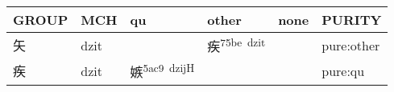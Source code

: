 \documentclass[14pt,a4paper]{scrartcl}
\begin{document}
\begin{longtable}[c]{@{}llllll@{}}
\toprule
\begin{minipage}[b]{0.14\columnwidth}\raggedright\strut
GROUP
\strut\end{minipage} &
\begin{minipage}[b]{0.14\columnwidth}\raggedright\strut
MCH
\strut\end{minipage} &
\begin{minipage}[b]{0.14\columnwidth}\raggedright\strut
qu
\strut\end{minipage} &
\begin{minipage}[b]{0.14\columnwidth}\raggedright\strut
other
\strut\end{minipage} &
\begin{minipage}[b]{0.14\columnwidth}\raggedright\strut
none
\strut\end{minipage} &
\begin{minipage}[b]{0.14\columnwidth}\raggedright\strut
PURITY
\strut\end{minipage}\tabularnewline
\midrule
\endhead
\begin{minipage}[t]{0.14\columnwidth}\raggedright\strut
矢
\strut\end{minipage} &
\begin{minipage}[t]{0.14\columnwidth}\raggedright\strut
dzit
\strut\end{minipage} &
\begin{minipage}[t]{0.14\columnwidth}\raggedright\strut
\strut\end{minipage} &
\begin{minipage}[t]{0.14\columnwidth}\raggedright\strut
疾\textsuperscript{75be~dzit}
\strut\end{minipage} &
\begin{minipage}[t]{0.14\columnwidth}\raggedright\strut
\strut\end{minipage} &
\begin{minipage}[t]{0.14\columnwidth}\raggedright\strut
pure:other
\strut\end{minipage}\tabularnewline
\begin{minipage}[t]{0.14\columnwidth}\raggedright\strut
疾
\strut\end{minipage} &
\begin{minipage}[t]{0.14\columnwidth}\raggedright\strut
dzit
\strut\end{minipage} &
\begin{minipage}[t]{0.14\columnwidth}\raggedright\strut
嫉\textsuperscript{5ac9~dzijH}
\strut\end{minipage} &
\begin{minipage}[t]{0.14\columnwidth}\raggedright\strut
\strut\end{minipage} &
\begin{minipage}[t]{0.14\columnwidth}\raggedright\strut
\strut\end{minipage} &
\begin{minipage}[t]{0.14\columnwidth}\raggedright\strut
pure:qu
\strut\end{minipage}\tabularnewline
\bottomrule
\end{longtable}
\end{document}
